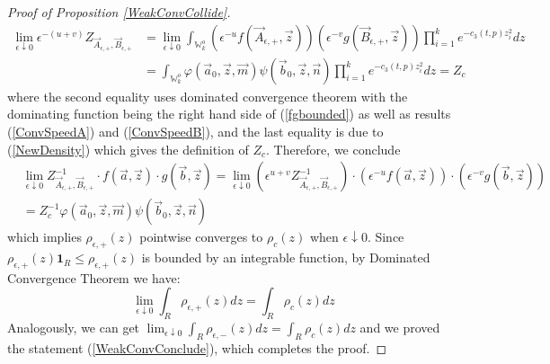 \begin{proof}[Proof of Proposition \ref{WeakConvCollide}]
\begin{equation}
\begin{split}
	\lim_{\epsilon\downarrow 0}\epsilon^{-(u+v)}Z_{\vec{A}_{\epsilon,+},\vec{B}_{\epsilon,+}}&=\lim_{\epsilon\downarrow 0}\int_{\mathbb{W}_{k}^{o}}\left(\epsilon^{-u}f(\vec{A}_{\epsilon,+},\vec{z})\right)\left(\epsilon^{-v}g(\vec{B}_{\epsilon,+},\vec{z})\right)\prod_{i=1}^{k}e^{-c_{3}(t,p)z^{2}_{i}}dz\\
	&=\int_{\mathbb{W}_{k}^{o}}\varphi(\vec{a}_{0},\vec{z},\vec{m})\psi(\vec{b}_{0},\vec{z},\vec{n})\prod_{i=1}^{k}e^{-c_{3}(t,p)z^{2}_{i}}dz=Z_c
\end{split}
\end{equation}
where the second equality uses dominated convergence theorem with the dominating function being the right hand side of (\ref{fgbounded}) as well as results (\ref{ConvSpeedA}) and (\ref{ConvSpeedB}), and the last equality is due to (\ref{NewDensity}) which gives the definition of $Z_c$.
Therefore, we conclude
\begin{equation}
	\begin{split}
		& \lim_{\epsilon\downarrow 0}Z_{\vec{A}_{\epsilon,+},\vec{B}_{\epsilon,+}}^{-1}\cdot f(\vec{a},\vec{z})\cdot g(\vec{b},\vec{z})=\lim_{\epsilon\downarrow 0}\left(\epsilon^{u+v}Z_{\vec{A}_{\epsilon,+},\vec{B}_{\epsilon,+}}^{-1}\right)\cdot \left(\epsilon^{-u}f(\vec{a},\vec{z})\right)\cdot\left(\epsilon^{-v}g(\vec{b},\vec{z})\right)\\
		&=Z_{c}^{-1}\varphi(\vec{a}_{0},\vec{z},\vec{m})\psi(\vec{b}_{0},\vec{z},\vec{n})
	\end{split}
\end{equation}
which implies $\rho_{\epsilon,+}(z)$ pointwise converges to $\rho_{c}(z)$ when $\epsilon\downarrow 0$.
Since $\rho_{\epsilon,+}(z)\mathbf{1}_{R}\leq\rho_{\epsilon,+}(z)$ is bounded by an integrable function, by Dominated Convergence Theorem we have: $$\lim_{\epsilon\downarrow 0}\int_{R}\rho_{\epsilon,+}(z)dz=\int_{R}\rho_{c}(z)dz$$ Analogously, we can get $\lim_{\epsilon\downarrow 0}\int_{R}\rho_{\epsilon,-}(z)dz=\int_{R}\rho_{c}(z)dz$ and we proved the statement (\ref{WeakConvConclude}), which completes the proof.
\end{proof}

